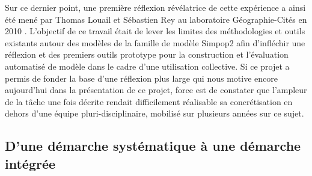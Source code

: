 {%

Sur ce dernier point, une première réflexion révélatrice de cette expérience a ainsi été mené par Thomas Louail et Sébastien Rey au laboratoire Géographie-Cités en 2010 \autocite{Louail2010}. L'objectif de ce travail était de lever les limites des méthodologies et outils existants autour des modèles de la famille de modèle Simpop2 afin d'infléchir une réflexion et des premiers outils prototype pour la construction et l'évaluation automatisé de modèle dans le cadre d'une utilisation collective. Si ce projet a permis de fonder la base d'une réflexion plus large qui nous motive encore aujourd'hui dans la présentation de ce projet, force est de constater que l'ampleur de la tâche une fois décrite rendait difficilement réalisable sa concrétisation en dehors d'une équipe pluri-disciplinaire, mobilisé sur plusieurs années sur ce sujet.


\subsection{D'une démarche systématique à une démarche intégrée}

}
